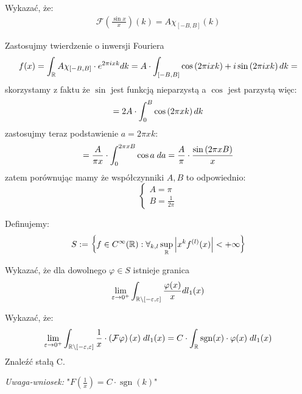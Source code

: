 \documentclass[11pt]{scrartcl}
\DeclareMathOperator{\sgn}{sgn}
\begin{document}
    \newpage

    \begin{zadanie*}
        Wykazać, że:
        \begin{gather*}
            \mathcal{F} \left ( \frac{\sin x}{x} \right ) (k) = A \chi_{[- B, B]} (k)
        \end{gather*}
    \end{zadanie*}

    Zastosujmy twierdzenie o inwersji Fouriera
    \[
        f(x) = \int_{\mathbb R} A \chi_{[-B, B]} \cdot e^{2 \pi i x k} dk = 
        A \cdot \int_{[-B, B]} \cos \left ( 2 \pi i x k \right ) + i \sin \left ( 2 \pi i x k \right ) dk =
    \]
    skorzystamy z faktu że $\sin$ jest funkcją nieparzystą a $\cos$ jest parzystą więc:
    \[
        = 2A \cdot \int_0^B \cos \left ( 2 \pi x k \right ) dk
    \]
    zastosujmy teraz podstawienie $a = 2 \pi x k$:
    \[
        = \frac{A}{\pi x} \cdot \int_0^{2 \pi x B} \cos a \; da 
        = \frac{A}{\pi} \cdot \frac{\sin \left ( 2 \pi x B \right )}{x}
    \]
    zatem porównując mamy że współczynniki $A, B$ to odpowiednio:
    \[
        \begin{cases}
            A = \pi \\
            B = \frac{1}{2 \pi}
        \end{cases}
    \] 

    \begin{zadanie*}
        Definujemy:
        \[
            S := \left \{ f \in C^{\infty } (\mathbb R) : 
                \forall_{k,l} \sup_{\mathbb R} \left\lvert x^k f^{(l)} (x) \right\rvert < + \infty   \right \}
        \]

        \begin{walk}
            \item Wykazać, że dla dowolnego $\varphi \in S$ istnieje granica
                \[
                    \lim_{\varepsilon \to 0^+} \int_{\mathbb R \backslash [-\varepsilon, \varepsilon]} 
                        \frac{\varphi (x)}{x} dl_1 (x)  
                \]
            \item Wykazać, że:
                \[
                     \lim_{\varepsilon \to 0^+} \int_{\RR \backslash [-\varepsilon, \varepsilon]} 
                         \frac{1}{x} \cdot \left ( \mathcal{F} \varphi  \right ) (x) \; dl_1 (x) =
                         C \cdot \int_{\RR} \sgn (x) \cdot \varphi (x) \; dl_1(x)
                \]
                Znaleźć stałą C.
        \end{walk}

        \textit{Uwaga-wniosek:} "$F \left ( \frac{1}{x} \right ) = C \cdot \sgn (k)$" 
    \end{zadanie*}
    
    
    
    
    
    
 
\end{document}
